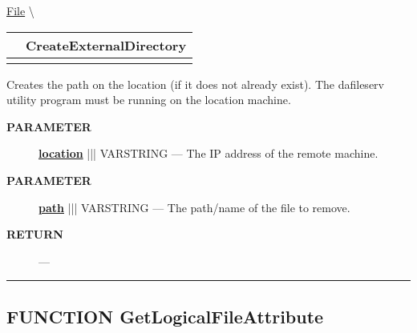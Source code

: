 \hypertarget{ecldoc:file.createexternaldirectory}{}
\hspace{0pt} \hyperlink{ecldoc:File}{File} \textbackslash 

{\renewcommand{\arraystretch}{1.5}
\begin{tabularx}{\textwidth}{|>{\raggedright\arraybackslash}l|X|}
\hline
\hspace{0pt}\mytexttt{\color{red} } & \textbf{CreateExternalDirectory} \\
\hline
\multicolumn{2}{|>{\raggedright\arraybackslash}X|}{\hspace{0pt}\mytexttt{\color{param} (varstring location, varstring path)}} \\
\hline
\end{tabularx}
}

\par





Creates the path on the location (if it does not already exist). The dafileserv utility program must be running on the location machine.






\par
\begin{description}
\item [\colorbox{tagtype}{\color{white} \textbf{\textsf{PARAMETER}}}] \textbf{\underline{location}} ||| VARSTRING --- The IP address of the remote machine.
\item [\colorbox{tagtype}{\color{white} \textbf{\textsf{PARAMETER}}}] \textbf{\underline{path}} ||| VARSTRING --- The path/name of the file to remove.
\end{description}







\par
\begin{description}
\item [\colorbox{tagtype}{\color{white} \textbf{\textsf{RETURN}}}] \textbf{} --- 
\end{description}




\rule{\linewidth}{0.5pt}
\subsection*{\textsf{\colorbox{headtoc}{\color{white} FUNCTION}
GetLogicalFileAttribute}}

